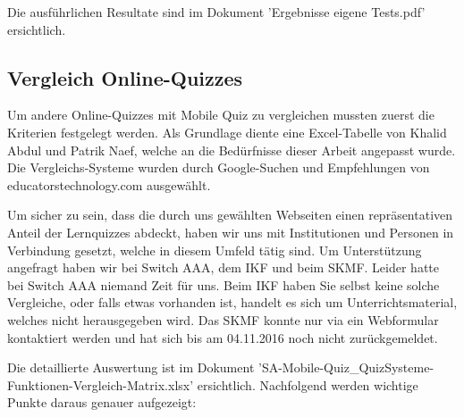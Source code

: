 	Die ausführlichen Resultate sind im Dokument 'Ergebnisse eigene Tests.pdf' ersichtlich.
	

	\subsection{Vergleich Online-Quizzes}
	Um andere Online-Quizzes mit Mobile Quiz zu vergleichen mussten zuerst die Kriterien festgelegt werden. Als Grundlage diente eine Excel-Tabelle von Khalid Abdul und Patrik Naef, welche an die Bedürfnisse dieser Arbeit angepasst wurde.
	Die Vergleichs-Systeme wurden durch Google-Suchen und Empfehlungen von educatorstechnology.com \cite{educatorstechnology.com} ausgewählt.
		
	Um sicher zu sein, dass die durch uns gewählten Webseiten einen repräsentativen Anteil der Lernquizzes abdeckt, haben wir uns mit Institutionen und Personen in Verbindung gesetzt, welche in diesem Umfeld tätig sind. Um Unterstützung angefragt haben wir bei Switch AAA, dem \acrfull{IKF} und beim \acrfull{SKMF}.
	Leider hatte bei Switch AAA niemand Zeit für uns. Beim \acrshort{IKF} haben Sie selbst keine solche Vergleiche, oder falls etwas vorhanden ist, handelt es sich um Unterrichtsmaterial, welches nicht herausgegeben wird. Das \acrshort{SKMF} konnte nur via ein Webformular kontaktiert werden und hat sich bis am 04.11.2016 noch nicht zurückgemeldet.
	
	\bigskip
	
	Die detaillierte Auswertung ist im Dokument 'SA-Mobile-Quiz\_QuizSysteme-Funktionen-Vergleich-Matrix.xlsx' ersichtlich. Nachfolgend werden wichtige Punkte daraus genauer aufgezeigt:
	

